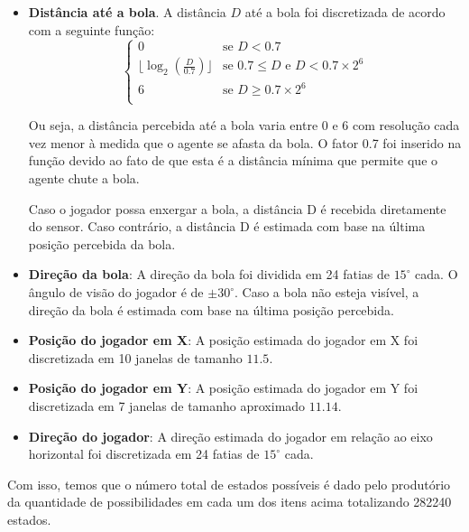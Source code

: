 \begin{itemize}
    \item \textbf{Distância até a bola}. A distância $D$ até a bola foi discretizada de acordo com a seguinte função:
    \begin{equation}
    \label{eq:balldist}
    \left\{
        \begin{array}{ll}
            0  & \mbox{se } D < 0.7 \\
            \lfloor\log_2 (\frac{D}{0.7})\rfloor & \mbox{se } 0.7 \leq D \mbox{ e } D < 0.7 \times 2^6 \\
            6  & \mbox{se } D \geq 0.7 \times 2^6 \\

        \end{array}
    \right.
    \end{equation}

    Ou seja, a distância percebida até a bola varia entre 0 e 6 com resolução cada vez menor à medida que o agente se afasta da bola. O fator 0.7 foi inserido na função devido ao fato de que esta é a distância mínima que permite que o agente chute a bola.

    Caso o jogador possa enxergar a bola, a distância D é recebida diretamente do sensor. Caso contrário, a distância D é estimada com base na última posição percebida da bola.

    \item \textbf{Direção da bola}: A direção da bola foi dividida em 24 fatias de $15^{\circ}$ cada. O ângulo de visão do jogador é de $\pm30^{\circ}$. Caso a bola não esteja visível, a direção da bola é estimada com base na última posição percebida.
    
    \item \textbf{Posição do jogador em X}: A posição estimada do jogador em X foi discretizada em 10 janelas de tamanho $11.5$.

    \item \textbf{Posição do jogador em Y}: A posição estimada do jogador em Y foi discretizada em 7 janelas de tamanho aproximado $11.14$.
    
    \item \textbf{Direção do jogador}: A direção estimada do jogador em relação ao eixo horizontal foi discretizada em 24 fatias de $15^{\circ}$ cada.

\end{itemize}

Com isso, temos que o número total de estados possíveis é dado pelo produtório da quantidade de possibilidades em cada um dos itens acima totalizando 282240 estados.

